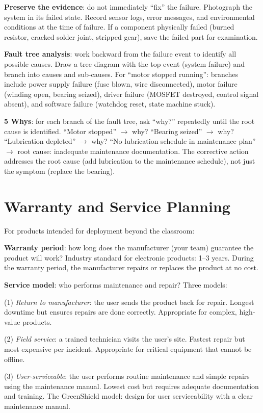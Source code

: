 \documentclass[11pt,letterpaper,twoside,openany]{book}
\begin{document}
\textbf{Preserve the evidence}: do not immediately ``fix'' the failure. Photograph the system in its failed state. Record sensor logs, error messages, and environmental conditions at the time of failure. If a component physically failed (burned resistor, cracked solder joint, stripped gear), save the failed part for examination.

\textbf{Fault tree analysis}: work backward from the failure event to identify all possible causes. Draw a tree diagram with the top event (system failure) and branch into causes and sub-causes. For ``motor stopped running'': branches include power supply failure (fuse blown, wire disconnected), motor failure (winding open, bearing seized), driver failure (MOSFET destroyed, control signal absent), and software failure (watchdog reset, state machine stuck).

\textbf{5 Whys}: for each branch of the fault tree, ask ``why?'' repeatedly until the root cause is identified. ``Motor stopped'' $\to$ why? ``Bearing seized'' $\to$ why? ``Lubrication depleted'' $\to$ why? ``No lubrication schedule in maintenance plan'' $\to$ root cause: inadequate maintenance documentation. The corrective action addresses the root cause (add lubrication to the maintenance schedule), not just the symptom (replace the bearing).

\section{Warranty and Service Planning}
For products intended for deployment beyond the classroom:

\textbf{Warranty period}: how long does the manufacturer (your team) guarantee the product will work? Industry standard for electronic products: 1--3 years. During the warranty period, the manufacturer repairs or replaces the product at no cost.

\textbf{Service model}: who performs maintenance and repair? Three models:

(1) \emph{Return to manufacturer}: the user sends the product back for repair. Longest downtime but ensures repairs are done correctly. Appropriate for complex, high-value products.

(2) \emph{Field service}: a trained technician visits the user's site. Fastest repair but most expensive per incident. Appropriate for critical equipment that cannot be offline.

(3) \emph{User-serviceable}: the user performs routine maintenance and simple repairs using the maintenance manual. Lowest cost but requires adequate documentation and training. The GreenShield model: design for user serviceability with a clear maintenance manual.
\end{document}
